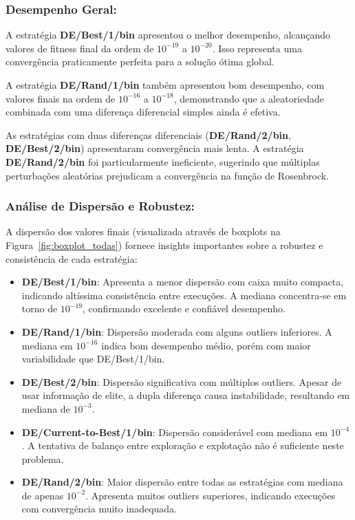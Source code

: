 \documentclass[runningheads]{llncs}
\begin{document}
\subsubsection{Desempenho Geral: }

A estratégia \textbf{DE/Best/1/bin} apresentou o melhor desempenho, alcançando valores de fitness final da ordem de $10^{-19}$ a $10^{-20}$. Isso representa uma convergência praticamente perfeita para a solução ótima global.

A estratégia \textbf{DE/Rand/1/bin} também apresentou bom desempenho, com valores finais na ordem de $10^{-16}$ a $10^{-18}$, demonstrando que a aleatoriedade combinada com uma diferença diferencial simples ainda é efetiva.

As estratégias com duas diferenças diferenciais (\textbf{DE/Rand/2/bin}, \textbf{DE/Best/2/bin}) apresentaram convergência mais lenta. A estratégia \textbf{DE/Rand/2/bin} foi particularmente ineficiente, sugerindo que múltiplas perturbações aleatórias prejudicam a convergência na função de Rosenbrock.

\subsubsection{Análise de Dispersão e Robustez: }

A dispersão dos valores finais (visualizada através de boxplots na Figura~\ref{fig:boxplot_todas}) fornece insights importantes sobre a robustez e consistência de cada estratégia:

\begin{itemize}
    \item \textbf{DE/Best/1/bin}: Apresenta a menor dispersão com caixa muito compacta, indicando altíssima consistência entre execuções. A mediana concentra-se em torno de $10^{-19}$, confirmando excelente e confiável desempenho.
    
    \item \textbf{DE/Rand/1/bin}: Dispersão moderada com alguns outliers inferiores. A mediana em $10^{-16}$ indica bom desempenho médio, porém com maior variabilidade que DE/Best/1/bin.
    
    \item \textbf{DE/Best/2/bin}: Dispersão significativa com múltiplos outliers. Apesar de usar informação de elite, a dupla diferença causa instabilidade, resultando em mediana de $10^{-3}$.
    
    \item \textbf{DE/Current-to-Best/1/bin}: Dispersão considerável com mediana em $10^{-4}$. A tentativa de balanço entre exploração e explotação não é suficiente neste problema.
    
    \item \textbf{DE/Rand/2/bin}: Maior dispersão entre todas as estratégias com mediana de apenas $10^{-2}$. Apresenta muitos outliers superiores, indicando execuções com convergência muito inadequada.
\end{itemize}
\end{document}
